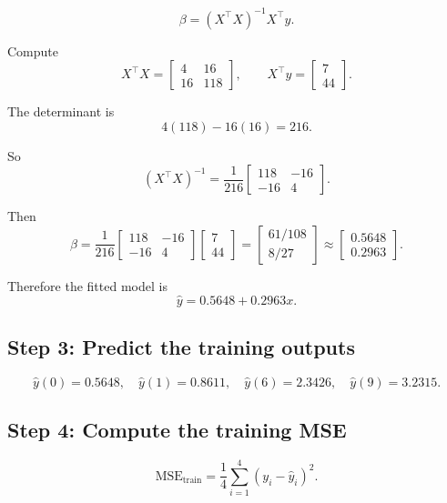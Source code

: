 \documentclass[11pt]{article}
\begin{document}
\[
    \beta = (X^\top X)^{-1}X^\top y.
\]

Compute
\[
    X^\top X =
    \begin{bmatrix}
        4 & 16 \\
        16 & 118
    \end{bmatrix},
    \qquad
    X^\top y =
    \begin{bmatrix}
        7 \\ 44
    \end{bmatrix}.
\]

The determinant is
\[
    4(118)-16(16)=216.
\]

So
\[
    (X^\top X)^{-1}
    =
    \frac{1}{216}
    \begin{bmatrix}
        118 & -16 \\
        -16 & 4
    \end{bmatrix}.
\]

Then
\[
    \beta
    =
    \frac{1}{216}
    \begin{bmatrix}
        118 & -16 \\
        -16 & 4
    \end{bmatrix}
    \begin{bmatrix}
        7 \\ 44
    \end{bmatrix}
    =
    \begin{bmatrix}
        61/108 \\
        8/27
    \end{bmatrix}
    \approx
    \begin{bmatrix}
        0.5648 \\
        0.2963
    \end{bmatrix}.
\]

Therefore the fitted model is
\[
    \boxed{\hat y = 0.5648 + 0.2963x.}
\]

\subsection*{Step 3: Predict the training outputs}

\[
    \hat y(0)=0.5648,\quad
    \hat y(1)=0.8611,\quad
    \hat y(6)=2.3426,\quad
    \hat y(9)=3.2315.
\]

\subsection*{Step 4: Compute the training MSE}

\[
    \text{MSE}_{\text{train}}
    =
    \frac{1}{4}\sum_{i=1}^{4}(y_i-\hat y_i)^2.
\]
\end{document}
